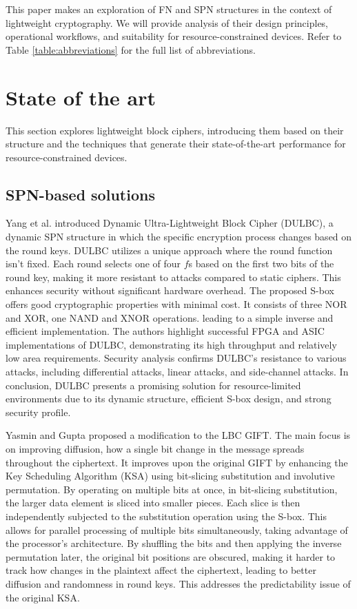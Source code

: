 \documentclass[conference]{IEEEtran}
\begin{document}
This paper makes an exploration of FN and SPN structures in the context of lightweight cryptography. We will provide analysis of their design principles, operational workflows, and suitability for resource-constrained devices. Refer to Table \ref{table:abbreviations} for the full list of abbreviations.

\section{State of the art}

This section explores lightweight block ciphers, introducing them based on their structure and the techniques that generate their state-of-the-art performance for resource-constrained devices.

\subsection{SPN-based solutions}

Yang et al. introduced Dynamic Ultra-Lightweight Block Cipher (DULBC), a dynamic SPN structure in which the specific encryption process changes based on the round keys. DULBC utilizes a unique approach where the round function isn't fixed. Each round selects one of four $f$s based on the first two bits of the round key, making it more resistant to attacks compared to static ciphers. This enhances security without significant hardware overhead. The proposed S-box offers good cryptographic properties with minimal cost. It consists of three NOR and XOR, one NAND and XNOR operations. leading to a simple inverse and efficient implementation. The authors highlight successful FPGA and ASIC implementations of DULBC, demonstrating its high throughput and relatively low area requirements. Security analysis confirms DULBC's resistance to various attacks, including differential attacks, linear attacks, and side-channel attacks. In conclusion, DULBC presents a promising solution for resource-limited environments due to its dynamic structure, efficient S-box design, and strong security profile\cite{DULBC}.


Yasmin and Gupta proposed a modification to the LBC GIFT\cite{GIFT}. The main focus is on improving diffusion, how a single bit change in the message spreads throughout the ciphertext. It improves upon the original GIFT by enhancing the Key Scheduling Algorithm (KSA) using bit-slicing substitution and involutive permutation. By operating on multiple bits at once, in bit-slicing substitution, the larger data element is sliced into smaller pieces. Each slice is then independently subjected to the substitution operation using the S-box. This allows for parallel processing of multiple bits simultaneously, taking advantage of the processor's architecture. By shuffling the bits and then applying the inverse permutation later, the original bit positions are obscured, making it harder to track how changes in the plaintext affect the ciphertext, leading to better diffusion and randomness in round keys. This addresses the predictability issue of the original KSA\cite{yasmin2023modified}.
\end{document}
